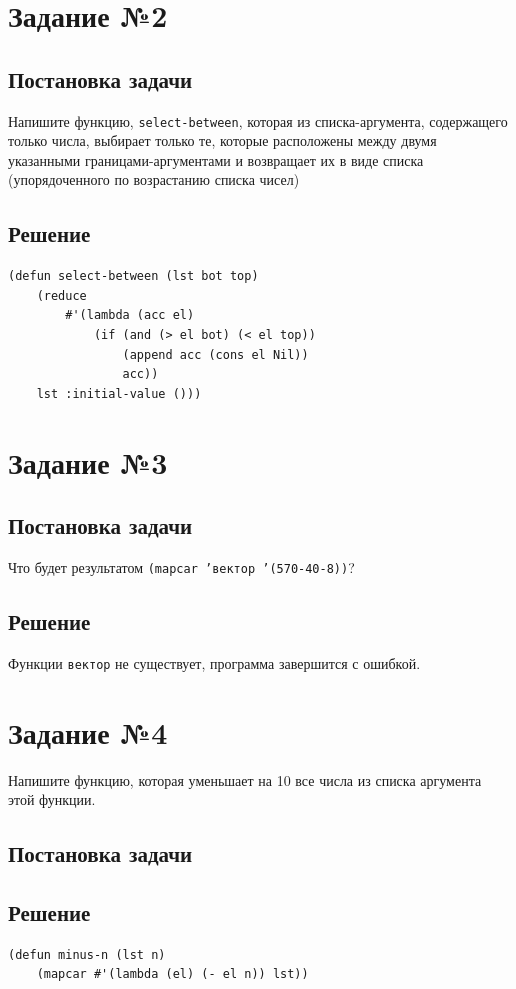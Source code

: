 \documentclass[12pt]{report}
\begin{document}
\section*{Задание №2}
\subsection*{Постановка задачи}
Напишите функцию, \texttt{select-between}, которая из списка-аргумента, содержащего только числа, выбирает только те, которые расположены между двумя указанными границами-аргументами и возвращает их в виде списка (упорядоченного по возрастанию списка чисел)

\subsection*{Решение}
\begin{lstlisting}
(defun select-between (lst bot top)
	(reduce
		#'(lambda (acc el)
			(if (and (> el bot) (< el top))
				(append acc (cons el Nil))
				acc))
	lst :initial-value ()))
\end{lstlisting}

\section*{Задание №3}
\subsection*{Постановка задачи}
Что будет результатом \texttt{(mapcar 'вектор '(570-40-8))}?

\subsection*{Решение}
Функции \texttt{вектор} не существует, программа завершится с ошибкой.

\section*{Задание №4}
Напишите функцию, которая уменьшает на 10 все числа из списка аргумента этой функции.

\subsection*{Постановка задачи}
\subsection*{Решение}
\begin{lstlisting}
(defun minus-n (lst n)
	(mapcar #'(lambda (el) (- el n)) lst))
\end{lstlisting}
\end{document}
